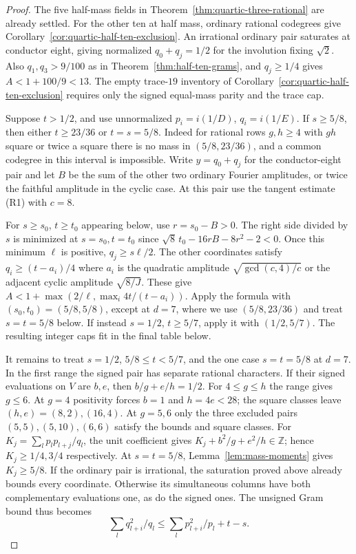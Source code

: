 \documentclass[11pt,reqno]{amsart}
\theoremstyle{remark}\newtheorem{remark}[theorem]{Remark}
\numberwithin{equation}{section}
\begin{document}
\begin{proof}
The five half-mass fields in
Theorem~\ref{thm:quartic-three-rational} are already settled.
For the other ten at half mass, ordinary rational codegrees give
Corollary~\ref{cor:quartic-half-ten-exclusion}. An irrational
ordinary pair saturates at conductor eight, giving normalized
$q_0+q_j=1/2$ for the involution fixing $\sqrt2$. Also $q_1,q_3>9/100$ as in Theorem~\ref{thm:half-ten-grams},
and $q_j\ge1/4$ gives $A<1+100/9<13$. The empty trace-$19$
inventory of Corollary~\ref{cor:quartic-half-ten-exclusion}
requires only the signed equal-mass parity and the trace cap.

Suppose $t>1/2$, and use unnormalized $p_i=i(1/D)$,
$q_i=i(1/E)$. If $s\ge5/8$, then either $t\ge23/36$ or
$t=s=5/8$. Indeed for rational rows $g,h\ge4$ with $gh$ square or twice a
square there is no mass in $(5/8,23/36)$, and a common codegree
in this interval is impossible.
Write $y=q_0+q_j$ for the
conductor-eight pair and let $B$ be the sum of the other two
ordinary Fourier amplitudes, or twice the faithful amplitude in
the cyclic case. At this pair use the tangent estimate (R1) with $c=8$.

For $s\ge s_0$, $t\ge t_0$ appearing below, use $r=s_0-B>0$.
The right side divided by $s$ is minimized at $s=s_0,t=t_0$
since $\sqrt8\,t_0-16rB-8r^2-2<0$. Once this minimum
$\ell$ is positive, $q_j\ge s\ell/2$. The other
coordinates satisfy $q_i\ge(t-a_i)/4$ where $a_i$ is the
quadratic amplitude $\sqrt{\gcd(c,4)/c}$ or the adjacent cyclic
amplitude $\sqrt{8/J}$. These give
$A<1+\max(2/\ell,\max_i4t/(t-a_i))$.
Apply the formula with $(s_0,t_0)=(5/8,5/8)$, except at $d=7$,
where we use $(5/8,23/36)$ and treat $s=t=5/8$ below. If instead
$s=1/2$, $t\ge5/7$, apply it with $(1/2,5/7)$.
The resulting integer caps fit in the final table below.

It remains to treat $s=1/2$, $5/8\le t<5/7$, and the one case
$s=t=5/8$ at $d=7$. In the first range the signed pair has
separate rational characters. If their signed evaluations on $V$
are $b,e$, then $b/g+e/h=1/2$. For $4\le g\le h$ the range gives $g\le6$. At $g=4$ positivity
forces $b=1$ and $h=4e<28$; the square classes leave
$(h,e)=(8,2),(16,4)$. At $g=5,6$ only the three excluded pairs
$(5,5),(5,10),(6,6)$ satisfy the bounds and square classes.
For $K_j=\sum_l p_l p_{l+j}/q_l$, the unit coefficient gives
$K_j+b^2/g+e^2/h\in\mathbb Z$; hence $K_j\ge1/4,3/4$ respectively.
At $s=t=5/8$, Lemma~\ref{lem:mass-moments} gives $K_j\ge5/8$.
If the ordinary pair is irrational, the saturation proved above
already bounds every coordinate. Otherwise its simultaneous
columns have both complementary evaluations one, as do the signed
ones. The unsigned Gram bound thus becomes
\[
 \sum_l q_{l+i}^2/q_l\le\sum_l p_{l+i}^2/p_l+t-s .
\]


\end{proof}
\end{document}
